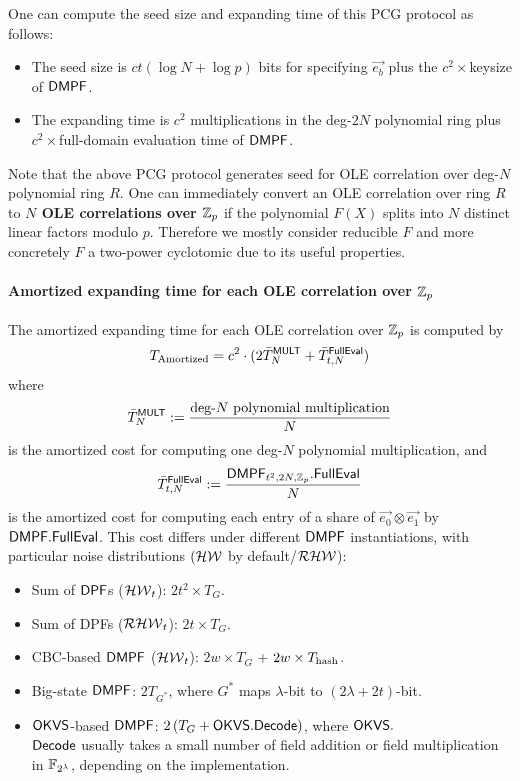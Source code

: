 One can compute the seed size and expanding time of this PCG protocol as follows: 
\begin{itemize}
    \item The seed size is $ct(\log N+\log p)$ bits for specifying $\vec{e_b}$ plus the $c^2\times $keysize of ${\sf DMPF}$. 
    \item The expanding time is $c^2$ multiplications in the deg-$2N$ polynomial ring  plus $c^2\times$full-domain evaluation time of ${\sf DMPF}$. 
\end{itemize}

\begin{remark}\label{rem:use_reducible_ring}
    Note that the above PCG protocol generates seed for OLE correlation over deg-$N$ polynomial ring $R$. One can immediately convert an OLE correlation over ring $R$ to \textbf{$N$ OLE correlations over $\mathbb{Z}_p$} if the polynomial $F(X)$ splits into $N$ distinct linear factors modulo $p$\cite{cryptoeprint:2022/1035}. Therefore we mostly consider reducible $F$ and more concretely $F$ a two-power cyclotomic due to its useful properties. 
\end{remark}

\paragraph{Amortized expanding time for each OLE correlation over $\mathbb{Z}_p$}The amortized expanding time for each OLE correlation over $\mathbb{Z}_p$ is computed by 
\[
  T_\text{Amortized} = c^2\cdot(2\bar{T}^{\sf MULT}_{N} + \bar{T}^{\sf FullEval}_{t,N})
\]
where 
\[
  \bar{T}^{\sf MULT}_{N} := \frac{\text{deg-}N\text{ polynomial multiplication}}{N}
\]
is the amortized cost for computing one deg-$N$ polynomial multiplication, and 
\[
  \bar{T}^{\sf FullEval}_{t,N}:=\frac{{\sf DMPF}_{t^2, 2N, \mathbb{Z}_p}.{\sf FullEval}}{N}
\]
is the amortized cost for computing each entry of a share of $\vec{e_0}\otimes\vec{e_1}$ by  ${\sf DMPF}.{\sf FullEval}$. This cost differs under different ${\sf DMPF}$ instantiations, with particular noise distributions $(\mathcal{HW}$ by default/$ \mathcal{RHW}$): 
\begin{itemize}
  \item Sum of ${\sf DPF}$s ($\mathcal{HW}_t$): $2t^2\times T_G$.
  \item Sum of DPFs ($\mathcal{RHW}_t$): $2t\times T_G$.
  \item CBC-based ${\sf DMPF}$ ($\mathcal{HW}_t$): $2w\times T_G$ + $2w\times T_{\rm hash}$.
  \item Big-state ${\sf DMPF}$: $2T_{G^*}$, where $G^*$ maps $\lambda$-bit to $(2\lambda+2t)$-bit. 
  \item ${\sf OKVS}$-based ${\sf DMPF}$: $2\left(T_G + {\sf OKVS}.{\sf Decode}\right)$, where ${\sf OKVS}.$\\${\sf Decode}$ usually takes a small number of field addition or field multiplication in $\mathbb{F}_{2^\lambda}$, depending on the implementation. 
\end{itemize}

